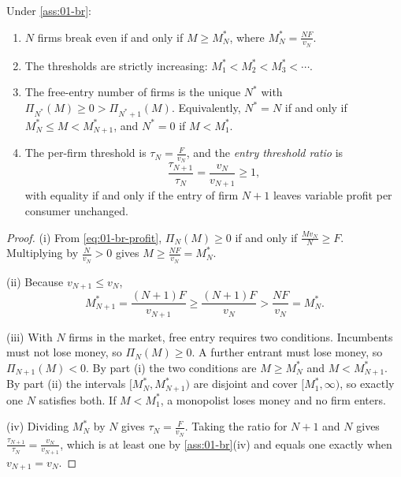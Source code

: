 \begin{proposition}\label{prop:01-entry-thresholds}
Under \cref{ass:01-br}:
\begin{enumerate}[label=(\roman*)]
  \item $N$ firms break even if and only if $M \ge M_N^*$, where $M_N^* = \frac{N F}{v_N}$.
  \item The thresholds are strictly increasing: $M_1^* < M_2^* < M_3^* < \cdots$.
  \item The free-entry number of firms is the unique $N^*$ with $\Pi_{N^*}(M) \ge 0 > \Pi_{N^* + 1}(M)$.
        Equivalently, $N^* = N$ if and only if $M_N^* \le M < M_{N+1}^*$, and $N^* = 0$ if $M < M_1^*$.
  \item The per-firm threshold is $\tau_N = \frac{F}{v_N}$, and the \emph{entry threshold ratio} is
        \begin{equation}\label{eq:01-etr}
          \frac{\tau_{N+1}}{\tau_N} = \frac{v_N}{v_{N+1}} \ge 1 ,
        \end{equation}
        with equality if and only if the entry of firm $N + 1$ leaves variable profit per consumer unchanged.
\end{enumerate}
\end{proposition}

\begin{proof}
(i) From \eqref{eq:01-br-profit}, $\Pi_N(M) \ge 0$ if and only if $\frac{M v_N}{N} \ge F$. Multiplying by
$\frac{N}{v_N} > 0$ gives $M \ge \frac{N F}{v_N} = M_N^*$.

(ii) Because $v_{N+1} \le v_N$,
\[
  M_{N+1}^* = \frac{(N + 1)F}{v_{N+1}} \ge \frac{(N + 1)F}{v_N} > \frac{N F}{v_N} = M_N^* .
\]

(iii) With $N$ firms in the market, free entry requires two conditions. Incumbents must not lose money, so
$\Pi_N(M) \ge 0$. A further entrant must lose money, so $\Pi_{N+1}(M) < 0$. By part (i) the two conditions
are $M \ge M_N^*$ and $M < M_{N+1}^*$. By part (ii) the intervals $[M_N^*, M_{N+1}^*)$ are disjoint and
cover $[M_1^*, \infty)$, so exactly one $N$ satisfies both. If $M < M_1^*$, a monopolist loses money and no
firm enters.

(iv) Dividing $M_N^*$ by $N$ gives $\tau_N = \frac{F}{v_N}$. Taking the ratio for $N + 1$ and $N$ gives
$\frac{\tau_{N+1}}{\tau_N} = \frac{v_N}{v_{N+1}}$, which is at least one by \cref{ass:01-br}(iv) and equals
one exactly when $v_{N+1} = v_N$.
\end{proof}

